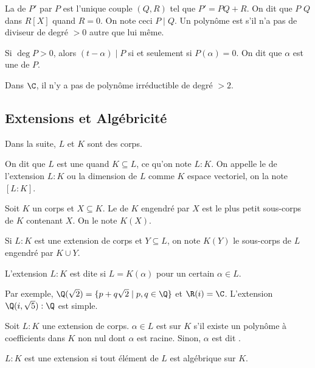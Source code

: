 \documentclass[math, info]{mpb-cours}
\begin{document}
\begin{definition}
	La  de $P'$ par $P$ est l'unique couple $(Q, R)$ tel que $P' = PQ + R$.
	On dit que $P$  $Q$ dans $R[X]$ quand $R = 0$.
	On note ceci $P \mid Q$.
	Un polynôme est  s'il n'a pas de diviseur de degré $> 0$ autre que lui même.
\end{definition}

\begin{thm}
	Si $\deg P > 0$, alors $(t - \alpha) \mid P$ si et seulement si $P(\alpha) = 0$.
	On dit que $\alpha$ est une  de $P$.
\end{thm}

\begin{thm}
	Dans $\C$, il n'y a pas de polynôme irréductible de degré $> 2$.
\end{thm}

\subsection{Extensions et Algébricité}
Dans la suite, $L$ et $K$ sont des corps.

\begin{definition}
	On dit que $L$ est une  quand $K \subseteq L$, ce qu'on note $L:K$.
	On appelle le  de l'extension $L:K$ ou  la dimension de $L$
	comme $K$ espace vectoriel, on la note $[L:K]$.
\end{definition}

\begin{definition}
	Soit $K$ un corps et $X \subseteq K$. Le  de $K$ engendré par $X$ est le plus petit
	sous-corps de	$K$ contenant $X$. On le note $K(X)$.

	\smallskip

	Si $L:K$ est une extension de corps et $Y \subseteq L$, on note $K(Y)$ le sous-corps de $L$ engendré par
	$K \cup Y$.

	\smallskip

	L'extension $L:K$ est dite  si $L = K(\alpha)$ pour un certain $\alpha \in L$.
\end{definition}

Par exemple, $\Q(\sqrt{2}) = \{p + q\sqrt{2} \mid p, q \in \Q\}$ et $\R(i) = \C$.
L'extension $\Q(i, \sqrt{5}):\Q$ est simple.


\begin{definition}
	Soit $L:K$ une extension de corps. $\alpha \in L$ est  sur $K$ s'il existe un polynôme
	à coefficients dans $K$ non nul dont $\alpha$ est racine.
	Sinon, $\alpha$ est dit .

	\smallskip

	$L:K$ est une extension  si tout élément de $L$ est algébrique sur $K$.
\end{definition}
\end{document}
